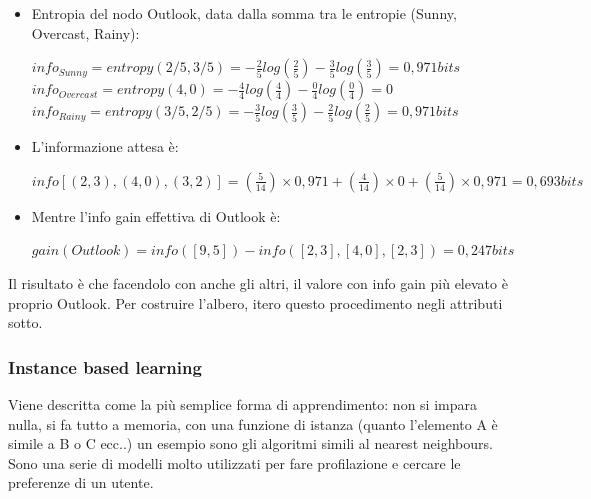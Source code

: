 \begin{itemize}
    \item Entropia del nodo Outlook, data dalla somma tra le entropie (Sunny, Overcast, Rainy):
    \begin{center}
        \begin{math}
            info_{Sunny} = entropy(2/5, 3/5) = -\frac{2}{5} log(\frac{2}{5}) - \frac{3}{5} log(\frac{3}{5}) = 0,971 bits  
        \end{math}
        \\[2ex]
        \begin{math}
            info_{Overcast} = entropy(4,0) = -\frac{4}{4} log(\frac{4}{4}) - \frac{0}{4} log(\frac{0}{4}) = 0  
        \end{math}
        \\[2ex]
        \begin{math}
            info_{Rainy} = entropy(3/5, 2/5) = -\frac{3}{5} log(\frac{3}{5}) - \frac{2}{5} log(\frac{2}{5}) = 0,971 bits
        \end{math}   
        \\
    \end{center}
    \item L'informazione attesa è:
    \begin{center}
        \begin{math}
            info[(2,3), (4,0), (3,2)] = (\frac{5}{14}) \times 0,971 + (\frac{4}{14}) \times 0 + (\frac{5}{14}) \times 0,971 = 0,693 bits
        \end{math}
    \end{center}
    \item Mentre l'info gain effettiva di Outlook è:
    \begin{center}
        \begin{math}
            gain(Outlook) = info([9,5]) - info([2,3], [4,0], [2,3]) = 0,247 bits
        \end{math}
    \end{center}
\end{itemize}
Il risultato è che facendolo con anche gli altri, il valore con info gain più elevato è proprio Outlook. Per costruire l'albero, itero questo procedimento negli attributi sotto. 

\newpage

\subsubsection{Instance based learning}
Viene descritta come la più semplice forma di apprendimento: non si impara nulla, si fa tutto a memoria, con una funzione di istanza (quanto l'elemento A è simile a B o C ecc..) un esempio sono gli algoritmi simili al nearest neighbours. 
\\ 
Sono una serie di modelli molto utilizzati per fare profilazione e cercare le preferenze di un utente.

